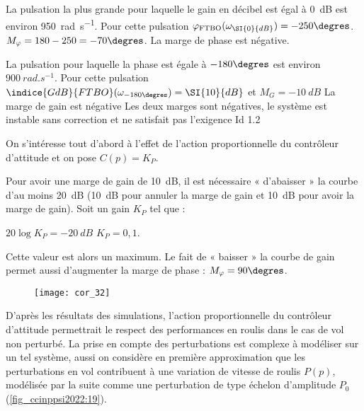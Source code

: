 \ifprof
\begin{corrige}
La pulsation la plus grande pour laquelle le gain en décibel est égal à \SI{0}{dB} est environ \SI{950}{rad.s^{-1}}. Pour cette pulsation $\varphi_{\text{FTBO}} (\omega_{\SI{0}{dB}} )=-250\degres$.
$M_{\varphi}=180-250=-70\degres$. La marge de phase est négative. 

La pulsation pour laquelle la phase est égale à $-180\degres$ est environ $\SI{900}{rad.s^{-1}}$. Pour cette pulsation $\indice{GdB}{FTBO}(\omega_{-180\degres} )=\SI{10}{dB}$ et $M_G=-\SI{10}{dB}$
La marge de gain est négative
Les deux marges sont négatives, le système est instable sans correction et ne satisfait pas l’exigence Id 1.2

\end{corrige}
\else
\fi

On s’intéresse tout d’abord à l’effet de l’action proportionnelle du contrôleur d’attitude et on
pose $C(p) = K_P$.


\ifprof
\begin{corrige}
Pour avoir une marge de gain de \SI{10}{dB}, il est nécessaire « d’abaisser » la courbe d’au moins \SI{20}{dB} (\SI{10}{dB} pour annuler la marge de gain et \SI{10}{dB} pour avoir la marge de gain). Soit un gain $K_P$ tel que :

$20 \log K_P = \SI{-20}{dB}$ $K_P = 0,1$.

Cette valeur est alors un maximum. Le fait de « baisser » la courbe de gain permet aussi d’augmenter la marge de phase :  $M_{\varphi}=90\degres$.

\begin{figure}[H]
\centering
\texttt{[image: cor\_32]}
\end{figure}

\end{corrige}
\else
\fi


D’après les résultats des simulations, l’action proportionnelle du contrôleur d’attitude permettrait le respect des performances en roulis dans le cas de vol non perturbé. La prise en
compte des perturbations est complexe à modéliser sur un tel système, aussi on considère
en première approximation que les perturbations en vol contribuent à une variation de vitesse
de roulis $P(p)$, modélisée par la suite comme une perturbation de type échelon d’amplitude $P_0$
(\autoref{fig_ccinppsi2022:19}).

